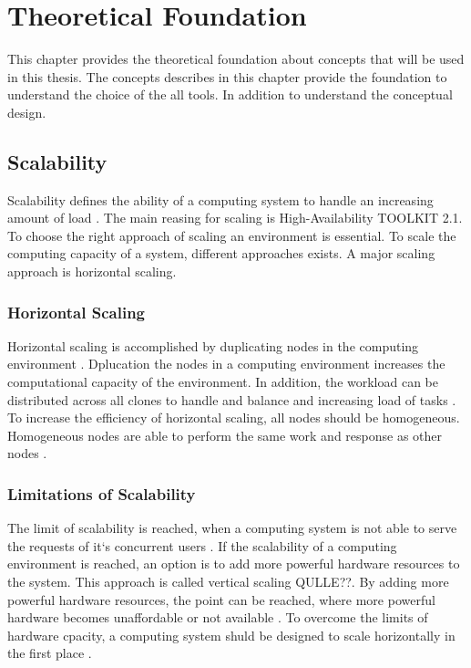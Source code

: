 \chapter{Theoretical Foundation}
\label{chap:02_foundation}


This chapter provides the theoretical foundation about concepts that will be used in this thesis. The concepts describes in this chapter provide the foundation to understand the choice of the all tools. In addition to understand the conceptual design.


\section{Scalability}
Scalability defines the ability of a computing system to handle an increasing amount of load \cite{Farcic2017Toolkit21}.
The main reasing for scaling is High-Availability TOOLKIT 2.1.
To choose the right approach of scaling an environment is essential.
To scale the computing capacity of a system, different approaches exists. A major scaling approach is horizontal scaling.



\subsection{Horizontal Scaling}
Horizontal scaling is accomplished by duplicating nodes in the computing environment \cite{Wilder2012CloudPatterns}.
Dplucation the nodes in a computing environment increases the computational capacity of the environment. In addition, the workload can be distributed across all clones to handle and balance and increasing load of tasks \cite{Wilder2012CloudPatterns, Abbott2015ScalabilityArt}. 
To increase the efficiency of horizontal scaling, all nodes should be homogeneous. Homogeneous nodes are able to perform the same work and response as other nodes \cite{Abbott2015ScalabilityArt}.


\subsection{Limitations of Scalability}
The limit of scalability is reached, when a computing system is not able to serve the requests of it`s concurrent users \cite{Wilder2012CloudPatterns}.
If the scalability of a computing environment is reached, an option is to add more powerful hardware resources to the system. This approach is called vertical scaling QULLE??. By adding more powerful hardware resources, the point can be reached, where more powerful hardware becomes unaffordable or not available \cite{Wilder2012CloudPatterns}.
To overcome the limits of hardware cpacity, a computing system shuld be designed to scale horizontally in the first place \cite{Abbott2015ScalabilityArt}.


